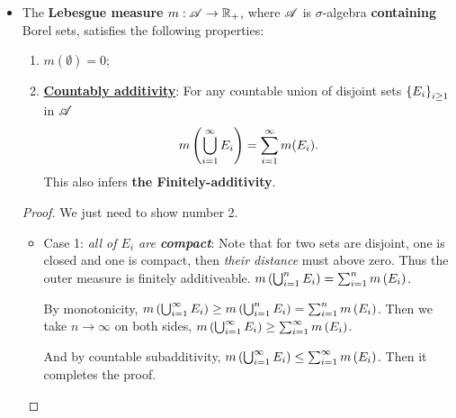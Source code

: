 \documentclass[11pt]{article}
\begin{document}
\begin{itemize}
\item  \begin{lemma} 
The \textbf{Lebesgue measure}  $m: {\mathscr A} \rightarrow {\mathbb R}_{+}$, where ${\mathscr A}$ is $\sigma$-algebra \textbf{containing} Borel sets,  satisfies the following properties:
\begin{enumerate}
\item $m(\emptyset) = 0$;
\item \underline{\textbf{Countably additivity}}:  For any countable union of disjoint sets $\left\{E_{i}\right\}_{i\ge 1}$ in ${\mathscr A}$ 
\begin{align*}
 m\left(\bigcup_{i=1}^{\infty}E_{i}\right) =  \sum_{i=1}^{\infty}m(E_{i}).
\end{align*} This also infers \textbf{the Finitely-additivity}.
\end{enumerate} 
\end{lemma}
\begin{proof} We just need to show number 2.
\begin{itemize}
\item Case 1: \emph{all of $E_{i}$ are \textbf{compact}}:  Note that for two sets are disjoint, one is closed and one is compact, then \emph{their distance} must above zero. Thus the outer measure is finitely additiveable. $m\left(\bigcup_{i=1}^{n}E_{i}\right)= \sum_{i=1}^{n}m\left(E_{i}\right)$. 

By monotonicity, $m\left(\bigcup_{i=1}^{\infty}E_{i}\right) \ge m\left(\bigcup_{i=1}^{n}E_{i}\right)= \sum_{i=1}^{n}m\left(E_{i}\right)$. Then we take $n\rightarrow \infty$ on both sides, $m\left(\bigcup_{i=1}^{\infty}E_{i}\right) \ge \sum_{i=1}^{\infty}m\left(E_{i}\right)$. 

And by countable subadditivity, $m\left(\bigcup_{i=1}^{\infty}E_{i}\right) \le \sum_{i=1}^{\infty}m\left(E_{i}\right)$. Then it completes the proof. 


\end{itemize}
\end{proof}
\end{itemize}
\end{document}
